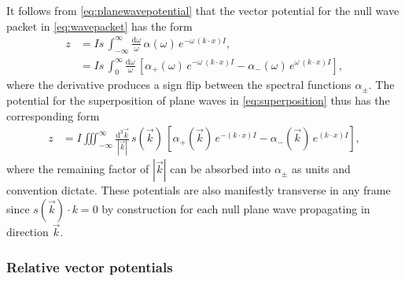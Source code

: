 \documentclass[1p,sort&compress]{elsarticle}
\numberwithin{equation}{section}
\newcommand{\rv}[1]{\vec{#1}}
\begin{document}
It follows from \eqref{eq:planewavepotential} that the vector potential for the null wave packet in \eqref{eq:wavepacket} has the form
\begin{align}\label{eq:wavepacketpotential}
  z &= Is\, \int_{-\infty}^\infty \! \frac{\textrm{d}\omega}{\omega}\,\alpha(\omega)\,e^{-\omega\,(k\cdot x) I}, \\
  &= Is\, \int_0^\infty \! \frac{\textrm{d}\omega}{\omega}\,\left[\alpha_+(\omega)\,e^{-\omega\,(k\cdot x) I} - \alpha_-(\omega)\,e^{\omega\,(k\cdot x) I}\right], \nonumber
\end{align}
where the derivative produces a sign flip between the spectral functions $\alpha_\pm$.  The potential for the superposition of plane waves in \eqref{eq:superposition} thus has the corresponding form
\begin{align}\label{eq:superpositionpotential}
  z &= I\iiint_{-\infty}^\infty \! \frac{\textrm{d}^3\rv{k}}{|\rv{k}|}\,s(\rv{k})\,[\alpha_+(\rv{k})\,e^{-(k\cdot x) I} - \alpha_-(\rv{k})\,e^{(k\cdot x) I}],
\end{align}
where the remaining factor of $|\rv{k}|$ can be absorbed into $\alpha_\pm$ as units and convention dictate.  These potentials are also manifestly transverse in any frame since $s(\rv{k})\cdot k = 0$ by construction for each null plane wave propagating in direction $\rv{k}$.


\subsubsection{Relative vector potentials}

\end{document}
